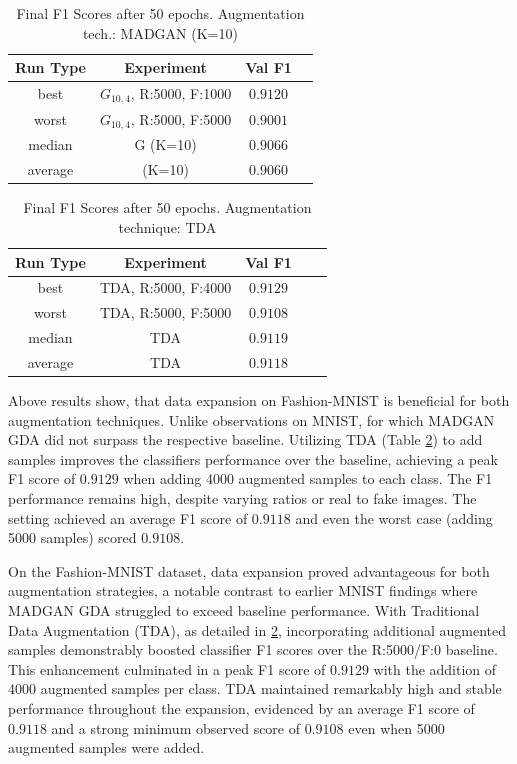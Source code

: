 \begin{table}[H]
	\vspace{-1.5em}
	\centering
	\begin{tabular}{|c|c|c|c|}
		\hline
		Run Type & Experiment & Val F1 \\ \hline
		best & \(G_{10, 4}\), R:5000, F:1000 & $0.9120$\\ \hline
		worst & \(G_{10, 4}\), R:5000, F:5000 & $0.9001$\\ \hline
		median & G (K=10) & $0.9066$\\ \hline
		average & (K=10) & $0.9060$
		\\ \hline
	\end{tabular}
    \caption{Final F1 Scores after 50 epochs. Augmentation tech.: MADGAN (K=10)}
        \label{tab:res_expansion_fashion_tda_vs_madgan__madgan}
\end{table}
\begin{table}[H]
	\centering
	\vspace{-1.5em}
	\begin{tabular}{|c|c|c|c|c|}
		\hline
		Run Type & Experiment & Val F1 \\ \hline
		best & TDA, R:5000, F:4000 & $0.9129$\\ \hline
		worst & TDA, R:5000, F:5000 & $0.9108$\\ \hline
		median & TDA & $0.9119$\\ \hline
		average & TDA & $0.9118$
		\\ \hline
	\end{tabular}
    \caption{Final F1 Scores after 50 epochs. Augmentation technique: TDA}
        \label{tab:res_expansion_fashion_tda_vs_madgan__tda}
\end{table}

Above results show, that data expansion on Fashion-MNIST is beneficial for both augmentation techniques. Unlike observations on MNIST, for which MADGAN GDA did not surpass the respective baseline. Utilizing TDA (Table \ref{tab:res_expansion_fashion_tda_vs_madgan__tda}) to add samples improves the classifiers performance over the baseline, achieving a peak F1 score of $0.9129$ when adding 4000 augmented samples to each class. The F1 performance remains high, despite varying ratios or real to fake images. The setting achieved an average F1 score of $0.9118$ and even the worst case (adding 5000 samples) scored $0.9108$.

On the Fashion-MNIST dataset, data expansion proved advantageous for both augmentation strategies, a notable contrast to earlier MNIST findings where MADGAN GDA struggled to exceed baseline performance. With Traditional Data Augmentation (TDA), as detailed in \ref{tab:res_expansion_fashion_tda_vs_madgan__tda}, incorporating additional augmented samples demonstrably boosted classifier F1 scores over the R:5000/F:0 baseline. This enhancement culminated in a peak F1 score of $0.9129$ with the addition of 4000 augmented samples per class. TDA maintained remarkably high and stable performance throughout the expansion, evidenced by an average F1 score of \(0.9118\) and a strong minimum observed score of \(0.9108\) even when 5000 augmented samples were added.


